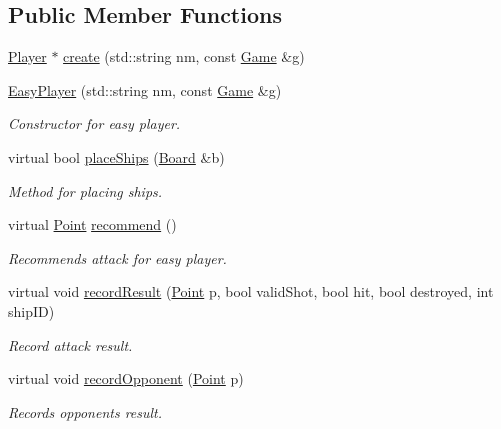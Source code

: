 \subsection*{Public Member Functions}
\begin{DoxyCompactItemize}
\item 
\mbox{\hyperlink{class_player}{Player}} $\ast$ \mbox{\hyperlink{class_easy_player_ae927ab9f7f4d152fd457e037ad7828a5}{create}} (std\+::string nm, const \mbox{\hyperlink{class_game}{Game}} \&g)
\item 
\mbox{\hyperlink{class_easy_player_abf0692676d0bf3c0eb6f6741c621c7ec}{Easy\+Player}} (std\+::string nm, const \mbox{\hyperlink{class_game}{Game}} \&g)
\begin{DoxyCompactList}\small\item\em Constructor for easy player. \end{DoxyCompactList}\item 
virtual bool \mbox{\hyperlink{class_easy_player_a4b9d5815113f393615412f7a98176a6c}{place\+Ships}} (\mbox{\hyperlink{class_board}{Board}} \&b)
\begin{DoxyCompactList}\small\item\em Method for placing ships. \end{DoxyCompactList}\item 
virtual \mbox{\hyperlink{class_point}{Point}} \mbox{\hyperlink{class_easy_player_a9b00f4a9acc74ff688c609bc15bdbb4d}{recommend}} ()
\begin{DoxyCompactList}\small\item\em Recommends attack for easy player. \end{DoxyCompactList}\item 
virtual void \mbox{\hyperlink{class_easy_player_a254a5ddcd421e1dc71e45125e7ab04d8}{record\+Result}} (\mbox{\hyperlink{class_point}{Point}} p, bool valid\+Shot, bool hit, bool destroyed, int ship\+ID)
\begin{DoxyCompactList}\small\item\em Record attack result. \end{DoxyCompactList}\item 
virtual void \mbox{\hyperlink{class_easy_player_a2121149ace67b4a67a5dfa7633738ea3}{record\+Opponent}} (\mbox{\hyperlink{class_point}{Point}} p)
\begin{DoxyCompactList}\small\item\em Records opponent\textquotesingle{}s result. \end{DoxyCompactList}\end{DoxyCompactItemize}


